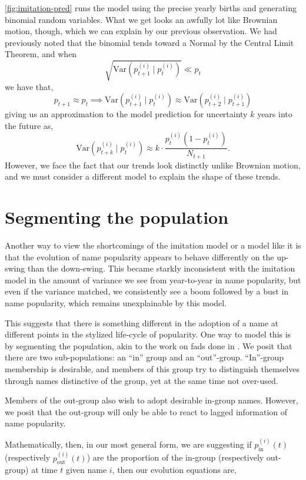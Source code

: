 \documentclass[a4paper]{article}
\newcommand{\var}{\text{Var}}
\begin{document}
\cref{fig:imitation-pred} runs the model using the precise yearly births and
generating binomial random variables. What we get looks an awfully lot like
Brownian motion, though, which we can explain by our previous observation. We
had previously noted that the binomial tends toward a Normal by the Central
Limit Theorem, and when
\[ \sqrt{\var(p_{t+1}^{(i)} \mid p_t^{(i)})} \ll p_t \]
we have that,
\[ p_{t+1} \approx p_t \implies \var(p_{t+1}^{(i)} \mid p_t^{(i)}) \approx \var(p_{t+2}^{(i)} \mid
p_{t+1}^{(i)}) \]
giving us an approximation to the model prediction for uncertainty $k$ years
into the future as,
\[ \var(p_{t+k}^{(i)} \mid p_t^{(i)}) \approx k \cdot
\frac{p_t^{(i)}(1-p_t^{(i)})}{N_{t+1}}.\]
However, we face the fact that our trends look distinctly unlike Brownian
motion, and we must consider a different model to explain the shape of these
trends.

\section{Segmenting the population}

Another way to view the shortcomings of the imitation model or a model like it
is that the evolution of name popularity appears to behave differently on the
up-swing than the down-swing. This became starkly inconsistent with the
imitation model in the amount of variance we see from year-to-year in name
popularity, but even if the variance matched, we consistently see a boom
followed by a bust in name popularity, which remains unexplainable by this
model.

This suggests that there is something different in the adoption of a name at
different points in the stylized life-cycle of popularity. One way to model this
is by segmenting the population, akin to the work on fads done in
\cite{bergman2012fad}. We posit that there are two sub-populations: an ``in''
group and an ``out''-group. ``In''-group membership is desirable, and members of
this group try to distinguish themselves through names distinctive of the group,
yet at the same time not over-used. 

Members of the out-group also wish to adopt desirable in-group names. However,
we posit that the out-group will only be able to react to lagged information of
name popularity.

Mathematically, then, in our most general form, we are suggesting if
$p_\text{in}^{(i)}{(t)}$ (respectively $p_\text{out}^{(i)}{(t)}$) are the
proportion of the in-group (respectively out-group) at time $t$ given name $i$,
then our evolution equations are,
\end{document}
